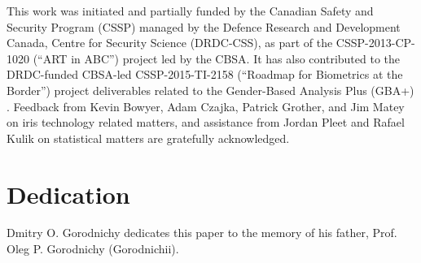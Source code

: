 \documentclass{cta-author}%
\begin{document}
This work was initiated and partially funded by the Canadian Safety and Security Program (CSSP) managed by the Defence Research and Development Canada,  Centre for Security Science (DRDC-CSS), as part of the CSSP-2013-CP-1020 (``ART in ABC'') project \cite{GorodnichyARTinABC} led by the CBSA. It has also contributed to the DRDC-funded CBSA-led CSSP-2015-TI-2158 (``Roadmap for Biometrics at the Border'') project deliverables related to the Gender-Based Analysis Plus (GBA+) \cite{GBA}.
Feedback from  Kevin Bowyer, Adam Czajka,  Patrick Grother, and Jim Matey on iris technology related matters, and assistance from Jordan Pleet and 
Rafael Kulik on statistical matters are  gratefully acknowledged.


\section*{Dedication}
Dmitry O. Gorodnichy dedicates this paper to the memory of his father, Prof. Oleg P. Gorodnichy (Gorodnichii).







\end{document}
